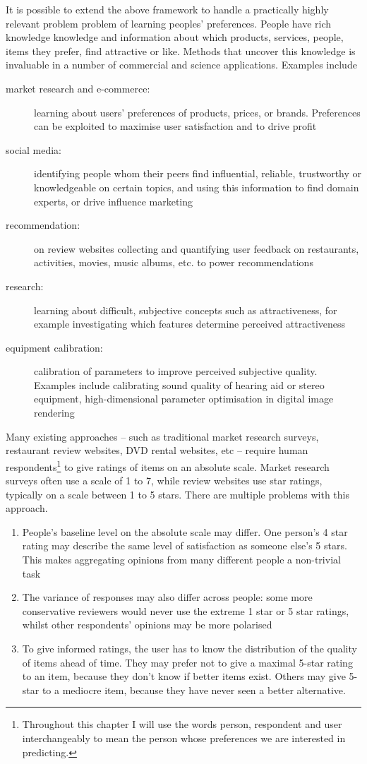 It is possible to extend the above framework to handle a practically highly relevant problem problem of learning peoples' preferences. People have rich knowledge knowledge and information about which products, services, people, items they prefer, find attractive or like. Methods that uncover this knowledge is invaluable in a number of commercial and science applications. Examples include
\begin{description}
	\item [market research and e-commerce:] learning about users' preferences of products, prices, or brands. Preferences can be exploited to maximise user satisfaction and to drive profit
	\item [social media:] identifying people whom their peers find influential, reliable, trustworthy or knowledgeable on certain topics, and using this information to find domain experts, or drive influence marketing
	\item [recommendation:] on review websites collecting and quantifying user feedback on restaurants, activities, movies, music albums, etc. to power recommendations
	\item [research:] learning about difficult, subjective concepts such as attractiveness, for example investigating which features determine perceived attractiveness
	\item [equipment calibration:] calibration of parameters to improve perceived subjective quality. Examples include calibrating sound quality of hearing aid or stereo equipment, high-dimensional parameter optimisation in digital image rendering
\end{description}

Many existing approaches -- such as traditional market research surveys, restaurant review websites, DVD rental websites, etc -- require human respondents\footnote{Throughout this chapter I will use the words person, respondent and user interchangeably to mean the person whose preferences we are interested in predicting.} to give ratings of items on an absolute scale. Market research surveys often use a scale of 1 to 7, while review websites use star ratings, typically on a scale between 1 to 5 stars. There are multiple problems with this approach.
\begin{enumerate}
	\item People's baseline level on the absolute scale may differ. One person's 4 star rating may describe the same level of satisfaction as someone else's 5 stars. This makes aggregating opinions from many different people a non-trivial task
	\item The variance of responses may also differ across people: some more conservative reviewers would never use the extreme 1 star or 5 star ratings, whilst other respondents' opinions may be more polarised
	\item To give informed ratings, the user has to know the distribution of the quality of items ahead of time. They may prefer not to give a maximal 5-star rating to an item, because they don't know if better items exist. Others may give 5-star to a mediocre item, because they have never seen a better alternative.
\end{enumerate} 

